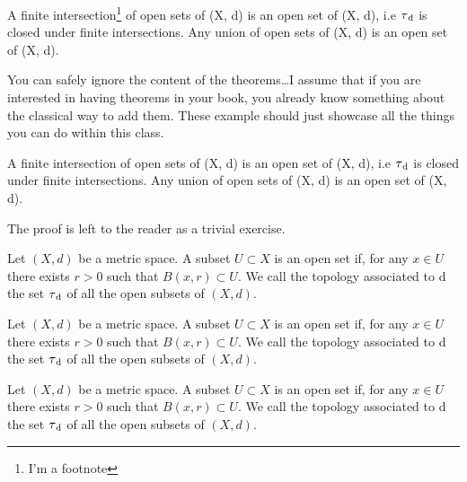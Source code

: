 \begin{Lemma}
	A finite intersection\footnote{I'm a footnote} of open sets of (X, d) is
	an open set of (X, d), i.e $\tau\textsubscript{d}$ is closed under
	finite intersections. Any union of open sets of (X, d) is an open set of
	(X, d).
\end{Lemma}

You can safely ignore the content of the theorems\ldots I assume that if
you are interested in having theorems in your book, you already know
something about the classical way to add them. These example should just
showcase all the things you can do within this class.

\begin{Corollary}
	A finite intersection of open sets of (X, d) is an open set of (X, d),
	i.e $\tau\textsubscript{d}$ is closed under finite intersections. Any
	union of open sets of (X, d) is an open set of (X, d).
\end{Corollary}

\begin{Proof*}
	The proof is left to the reader as a trivial exercise.
\end{Proof*}

\begin{Definition}
	Let $(X, d)$ be a metric space. A subset $U \subset X$ is an open set
	if, for any $x \in U$ there exists $r > 0$ such that $B(x, r) \subset
		U$. We call the topology associated to d the set $\tau\textsubscript{d}$
	of all the open subsets of $(X, d).$
\end{Definition}


\begin{Example}
	Let $(X, d)$ be a metric space. A subset $U \subset X$ is an open set
	if, for any $x \in U$ there exists $r > 0$ such that $B(x, r) \subset
		U$. We call the topology associated to d the set $\tau\textsubscript{d}$
	of all the open subsets of $(X, d).$
\end{Example}

\begin{remark}
	Let $(X, d)$ be a metric space. A subset $U \subset X$ is an open set
	if, for any $x \in U$ there exists $r > 0$ such that $B(x, r) \subset
		U$. We call the topology associated to d the set $\tau\textsubscript{d}$
	of all the open subsets of $(X, d).$
\end{remark}

